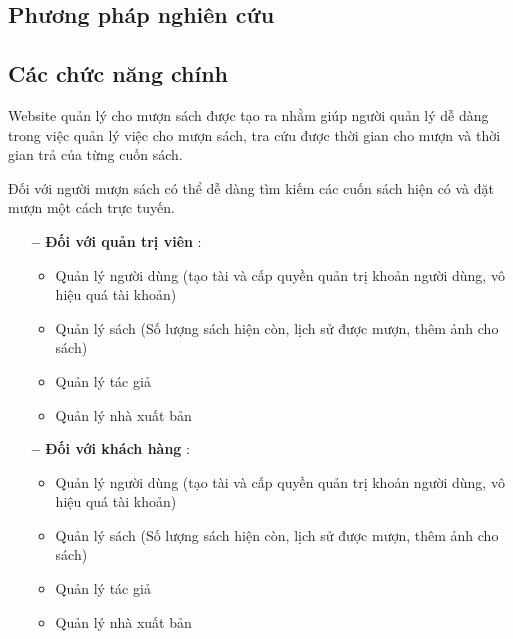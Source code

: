 \subsection{Phương pháp nghiên cứu}

\subsection{Các chức năng chính}
Website quản lý cho mượn sách được tạo ra nhằm giúp người quản lý dễ dàng trong việc quản lý việc cho mượn sách, tra cứu được thời gian cho mượn và thời gian trả của từng cuốn sách. \par
Đối với người mượn sách có thể dễ dàng tìm kiếm các cuốn sách hiện có và đặt mượn một cách trực tuyến.

\begin{itemize}[align=left, leftmargin=2cm]
  \item[\textbf{-- Đối với quản trị viên}]:
        \begin{itemize}[label={+}]
          \item Quản lý người dùng (tạo tài và cấp quyền quản trị khoản người dùng, vô hiệu quá tài khoản)
          \item Quản lý sách (Số lượng sách hiện còn, lịch sử được mượn, thêm ảnh cho sách)
          \item Quản lý tác giả
          \item Quản lý nhà xuất bản
        \end{itemize}
  \item[\textbf{-- Đối với khách hàng}]:
        \begin{itemize}[label={+}]
          \item Quản lý người dùng (tạo tài và cấp quyền quản trị khoản người dùng, vô hiệu quá tài khoản)
          \item Quản lý sách (Số lượng sách hiện còn, lịch sử được mượn, thêm ảnh cho sách)
          \item Quản lý tác giả
          \item Quản lý nhà xuất bản
        \end{itemize}
\end{itemize}
